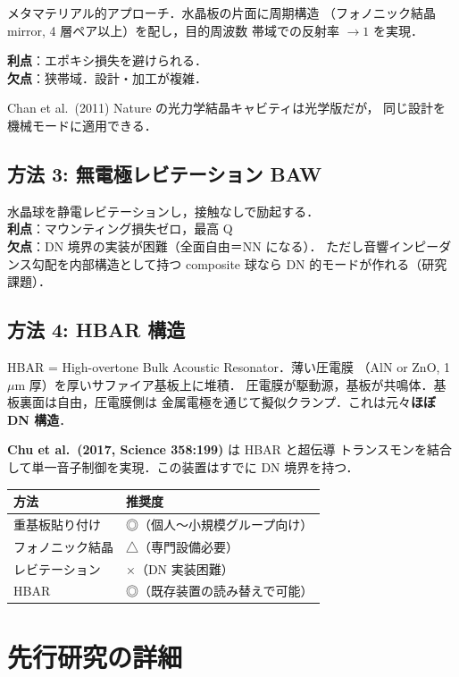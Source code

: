 \documentclass[11pt,a4paper]{article}
\begin{document}
メタマテリアル的アプローチ．水晶板の片面に周期構造
（フォノニック結晶 mirror, 4 層ペア以上）を配し，目的周波数
帯域での反射率 $\to 1$ を実現．

\textbf{利点}：エポキシ損失を避けられる．\\
\textbf{欠点}：狭帯域．設計・加工が複雑．

Chan et al.\ (2011) Nature の光力学結晶キャビティは光学版だが，
同じ設計を機械モードに適用できる．

\subsection{方法 3: 無電極レビテーション BAW}

水晶球を静電レビテーションし，接触なしで励起する．\\
\textbf{利点}：マウンティング損失ゼロ，最高 Q\\
\textbf{欠点}：DN 境界の実装が困難（全面自由＝NN になる）．
ただし音響インピーダンス勾配を内部構造として持つ
composite 球なら DN 的モードが作れる（研究課題）．

\subsection{方法 4: HBAR 構造}

HBAR = High-overtone Bulk Acoustic Resonator．薄い圧電膜
（AlN or ZnO, 1\,$\mu$m 厚）を厚いサファイア基板上に堆積．
圧電膜が駆動源，基板が共鳴体．基板裏面は自由，圧電膜側は
金属電極を通じて擬似クランプ．これは元々\textbf{ほぼ DN 構造}．

\textbf{Chu et al.\ (2017, Science 358:199)} は HBAR と超伝導
トランスモンを結合して単一音子制御を実現．この装置はすでに
DN 境界を持つ．

\begin{center}
\begin{tabular}{ll}
\toprule
方法 & 推奨度 \\
\midrule
重基板貼り付け & ◎（個人〜小規模グループ向け）\\
フォノニック結晶 & △（専門設備必要）\\
レビテーション & ×（DN 実装困難）\\
HBAR & ◎（既存装置の読み替えで可能）\\
\bottomrule
\end{tabular}
\end{center}

\section{先行研究の詳細}
\end{document}
